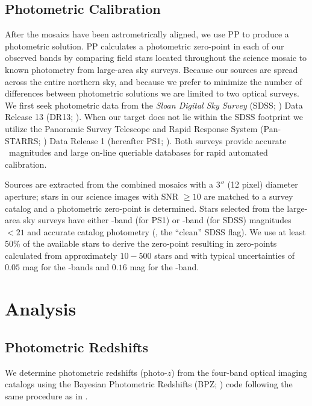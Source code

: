\documentclass[apj, revtex4-1]{emulateapj}
\begin{document}
\subsection{Photometric Calibration}
After the mosaics have been astrometrically aligned, we use PP to produce a photometric solution. PP calculates a photometric zero-point in each of our observed bands by comparing field stars located throughout the science mosaic to known photometry from large-area sky surveys. Because our sources are spread across the entire northern sky, and because we prefer to minimize the number of differences between photometric solutions we are limited to two optical surveys. We first seek photometric data from the \textit{Sloan Digital Sky Survey} (SDSS; \citealt{York2000}) Data Release 13 (DR13; \citealt{Albareti2017}). When our target does not lie within the SDSS footprint we utilize the Panoramic Survey Telescope and Rapid Response System (Pan-STARRS; \citealt{Chambers2016}) Data Release 1 (hereafter PS1; \citealt{Flewelling2016}). Both surveys provide accurate \sdssg\sdssr\sdssi\sdssz\ magnitudes and large on-line queriable databases for rapid automated calibration.

Sources are extracted from the combined mosaics with a $3''$ (12 pixel) diameter aperture; stars in our science images with SNR $\ge10$ are matched to a survey catalog and a photometric zero-point is determined. Stars selected from the large-area sky surveys have either \sdssr-band (for PS1) or \sdssg-band (for SDSS) magnitudes $<21$ and accurate catalog photometry (\eg, the ``clean'' SDSS flag). We use at least 50\% of the available stars to derive the zero-point resulting in zero-points calculated from approximately $10-500$ stars and with typical uncertainties of $0.05$ mag for the \sdssg\sdssr\sdssi-bands and $0.16$ mag for the \sdssz-band.

\section{Analysis}\label{sec:analysis}
\subsection{Photometric Redshifts}
We determine photometric redshifts (photo-$z$) from the four-band optical imaging catalogs using the Bayesian Photometric Redshifts (BPZ; \citealt{Benitez2000, Coe2006}) code following the same procedure as in \cite{Menanteau2009a}.
\end{document}
